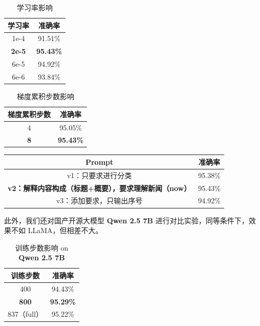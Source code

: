 \begin{table}[htbp]
    \centering
    \begin{tabular}{cc}
        \toprule
        学习率 & 准确率 \\
        \midrule
        1e-4 & 91.51\% \\
        \textbf{2e-5} & \textbf{95.43\%} \\
        6e-5 & 94.92\% \\
        6e-6 & 93.84\% \\
        \bottomrule
    \end{tabular}
    \caption{学习率影响}
\end{table}

\begin{table}[htbp]
    \centering
    \begin{tabular}{cc}
        \toprule
        梯度累积步数 & 准确率 \\
        \midrule
        4 & 95.05\% \\
        \textbf{8} & \textbf{95.43\%} \\
        \bottomrule
    \end{tabular}
    \caption{梯度累积步数影响}
\end{table}

\begin{table}[htbp]
    \centering
    \begin{tabular}{cc}
        \toprule
        Prompt & 准确率 \\
        \midrule
        v1：只要求进行分类 & 95.38\% \\
        \textbf{v2：解释内容构成（标题+概要），要求理解新闻（now）} & 95.43\% \\
        v3：添加要求，只输出序号 & 94.92\% \\
        \bottomrule
    \end{tabular}
\end{table}

此外，我们还对国产开源大模型 \textbf{Qwen 2.5 7B} 进行对比实验\cite{qwen2.5}，同等条件下，效果不如 LLaMA，但相差不大。

\begin{table}[htbp]
    \centering
    \begin{tabular}{cc}
        \toprule
        训练步数 & 准确率 \\
        \midrule
        400 & 94.43\% \\
        \textbf{800} & \textbf{95.29\%} \\
        837（full） & 95.22\% \\
        \bottomrule
    \end{tabular}
    \caption{训练步数影响 on \textbf{Qwen 2.5 7B}}
\end{table}

